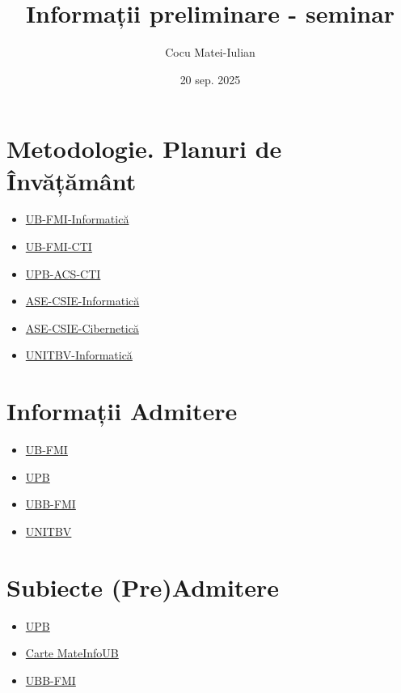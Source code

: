 \documentclass[11pt, a4paper]{article}
\title{Informații preliminare - seminar}
\author{Cocu Matei-Iulian}
\date{20 sep. 2025}
\begin{document}
\maketitle

\section{Metodologie. Planuri de Învățământ}
\begin{itemize}
    \item \href{https://drive.google.com/drive/folders/1Rfsn9hPv4oCGH2hZljUB70Yoj0AQc_-U}{UB-FMI-Informatică}
    \item \href{https://drive.google.com/drive/folders/1YN07bNSGm6tsg8Xum497jAcJB5qQputp}{UB-FMI-CTI}
    \item \href{https://acs.pub.ro/public/CTI-C-Licenta.pdf}{UPB-ACS-CTI}
    \item \href{https://csie.ase.ro/programe/informatica-economica/}{ASE-CSIE-Informatică}
    \item \href{https://csie.ase.ro/programe/cibernetica-economica/}{ASE-CSIE-Cibernetică}
    \item \href{https://mateinfo.unitbv.ro/images/2024_/Planuri_Invatamant/Plan_inv_Matematica_informatica_2024_2027.pdf}{UNITBV-Informatică}
\end{itemize}

\section{Informații Admitere}
\begin{itemize}
    \item \href{https://fmi.unibuc.ro/admitere-licenta-iulie-2025/}{UB-FMI}
    \item \href{https://admitere.pub.ro/Admitere/site/alegeCentru}{UPB}
    \item \href{https://www.cs.ubbcluj.ro/admitere/nivel-licenta/admiterea-la-facultatea-de-matematica-si-informatica-nivel-licenta/}{UBB-FMI}
    \item \href{https://mateinfo.unitbv.ro/ro/admitere/admitere-licenta.html}{UNITBV}
\end{itemize}

\section{Subiecte (Pre)Admitere}
\begin{itemize}
    \item \href{http://www.physics.pub.ro/Admitere/subiecte.html}{UPB}
    \item \href{https://drive.google.com/file/d/1q_3gIfcSsQ0KRT0LRzlUHNC3dQFd9SC7/view}{Carte MateInfoUB}
    \item \href{https://www.cs.ubbcluj.ro/admitere/nivel-licenta/subiecte-din-anii-precedenti/}{UBB-FMI}
\end{itemize}
\end{document}
